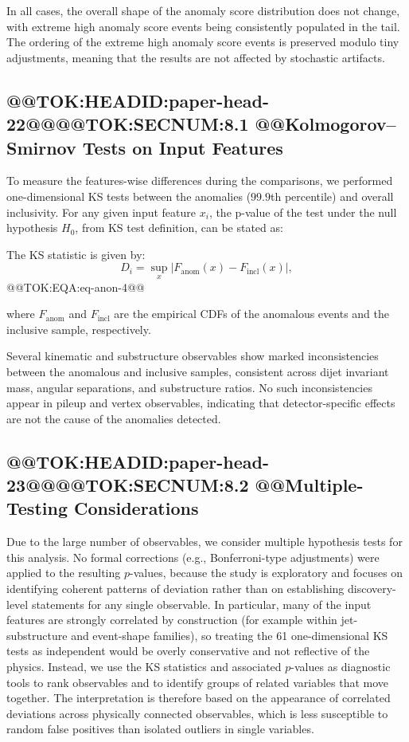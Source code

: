 \documentclass[11pt]{article}
\begin{document}
In all cases, the overall shape of the anomaly score distribution does not change, with extreme high anomaly score events being consistently populated in the tail.
The ordering of the extreme high anomaly score events is preserved modulo tiny adjustments, meaning that the results are not affected by stochastic artifacts.

\subsection{@@TOK:HEADID:paper-head-22@@@@TOK:SECNUM:8.1 @@Kolmogorov--Smirnov Tests on Input Features}

To measure the features-wise differences during the comparisons, we performed one-dimensional KS tests between the anomalies ($99.9$th percentile) and overall inclusivity.
For any given input feature $x_i$, the p-value of the test under the null hypothesis $H_0$, from KS test definition, can be stated as:

The KS statistic is given by:
\begin{equation}
D_i = \sup_x \left| F_{\mathrm{anom}}(x) - F_{\mathrm{incl}}(x) \right|,
\end{equation}@@TOK:EQA:eq-anon-4@@

where $F_{\mathrm{anom}}$ and $F_{\mathrm{incl}}$ are the empirical CDFs of the anomalous events and the inclusive sample, respectively.

Several kinematic and substructure observables show marked inconsistencies between the anomalous and inclusive samples, consistent across dijet invariant mass, angular separations, and substructure ratios. No such inconsistencies appear in pileup and vertex observables, indicating that detector-specific effects are not the cause of the anomalies detected.

\subsection{@@TOK:HEADID:paper-head-23@@@@TOK:SECNUM:8.2 @@Multiple-Testing Considerations}

Due to the large number of observables, we consider multiple hypothesis tests for this analysis. No formal corrections (e.g., Bonferroni-type adjustments) were applied to the resulting $p$-values, because the study is exploratory and focuses on identifying coherent patterns of deviation rather than on establishing discovery-level statements for any single observable. In particular, many of the input features are strongly correlated by construction (for example within jet-substructure and event-shape families), so treating the 61 one-dimensional KS tests as independent would be overly conservative and not reflective of the physics. Instead, we use the KS statistics and associated $p$-values as diagnostic tools to rank observables and to identify groups of related variables that move together. The interpretation is therefore based on the appearance of correlated deviations across physically connected observables, which is less susceptible to random false positives than isolated outliers in single variables.
\end{document}
